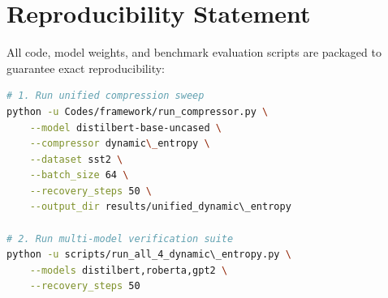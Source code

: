 \section{Reproducibility Statement}
All code, model weights, and benchmark evaluation scripts are packaged to guarantee exact reproducibility:
\begin{lstlisting}[language=bash]
# 1. Run unified compression sweep
python -u Codes/framework/run_compressor.py \
    --model distilbert-base-uncased \
    --compressor dynamic\_entropy \
    --dataset sst2 \
    --batch_size 64 \
    --recovery_steps 50 \
    --output_dir results/unified_dynamic\_entropy

# 2. Run multi-model verification suite
python -u scripts/run_all_4_dynamic\_entropy.py \
    --models distilbert,roberta,gpt2 \
    --recovery_steps 50
\end{lstlisting}

